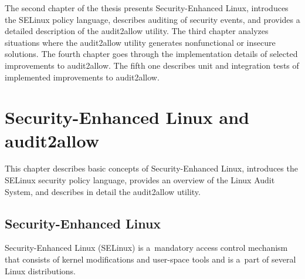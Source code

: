The second chapter of the thesis presents Security-Enhanced Linux, introduces
the SELinux policy language, describes auditing of security events, and provides
a detailed description of the audit2allow utility. The third chapter analyzes
situations where the audit2allow utility generates nonfunctional or insecure
solutions. The fourth chapter goes through the implementation details of
selected improvements to audit2allow. The fifth one describes unit and
integration tests of implemented improvements to audit2allow.

\chapter{Security-Enhanced Linux and audit2allow}
\label{selinux}

This chapter describes basic concepts of Security-Enhanced Linux, introduces the
SELinux security policy language, provides an overview of the Linux Audit
System, and describes in detail the audit2allow utility.

\section{Security-Enhanced Linux}
Security-Enhanced Linux (SELinux) is a~mandatory access control mechanism that
consists of kernel modifications and user-space tools and is a~part of several
Linux distributions.

